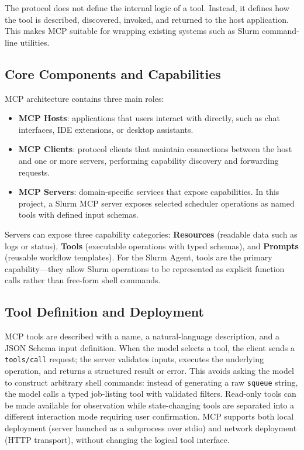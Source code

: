 The protocol does not define the internal logic of a tool. Instead, it defines how the tool is described, discovered, invoked, and returned to the host application. This makes MCP suitable for wrapping existing systems such as Slurm command-line utilities.

\subsection{Core Components and Capabilities}

MCP architecture contains three main roles:

\begin{itemize}
    \item \textbf{MCP Hosts}: applications that users interact with directly, such as chat interfaces, IDE extensions, or desktop assistants.
    \item \textbf{MCP Clients}: protocol clients that maintain connections between the host and one or more servers, performing capability discovery and forwarding requests.
    \item \textbf{MCP Servers}: domain-specific services that expose capabilities. In this project, a Slurm MCP server exposes selected scheduler operations as named tools with defined input schemas.
\end{itemize}

Servers can expose three capability categories: \textbf{Resources} (readable data such as logs or status), \textbf{Tools} (executable operations with typed schemas), and \textbf{Prompts} (reusable workflow templates). For the Slurm Agent, tools are the primary capability---they allow Slurm operations to be represented as explicit function calls rather than free-form shell commands.

\subsection{Tool Definition and Deployment}

MCP tools are described with a name, a natural-language description, and a JSON Schema input definition. When the model selects a tool, the client sends a \texttt{tools/call} request; the server validates inputs, executes the underlying operation, and returns a structured result or error. This avoids asking the model to construct arbitrary shell commands: instead of generating a raw \texttt{squeue} string, the model calls a typed job-listing tool with validated filters. Read-only tools can be made available for observation while state-changing tools are separated into a different interaction mode requiring user confirmation. MCP supports both local deployment (server launched as a subprocess over stdio) and network deployment (HTTP transport), without changing the logical tool interface.

